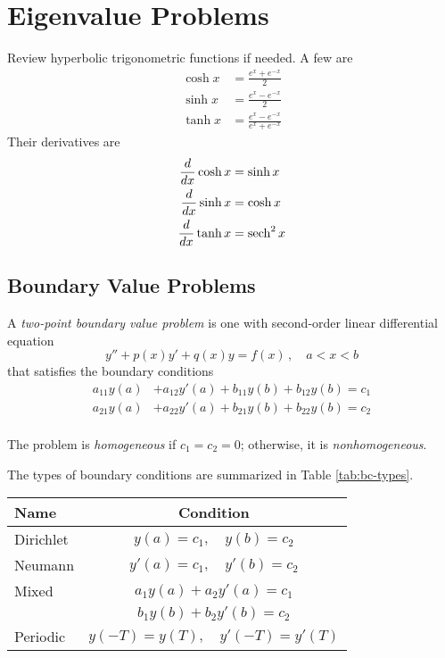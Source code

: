 \chapter{Eigenvalue Problems}
Review hyperbolic trigonometric functions if needed. A few are
\begin{align*}
    \cosh x & = \frac{e^x + e^{-x}}{2} \\
    \sinh x & = \frac{e^x - e^{-x}}{2} \\
    \tanh x & = \frac{e^x - e^{-x}}{e^x + e^{-x}} 
\end{align*}
Their derivatives are
\begin{align*}
    \frac{d}{dx}\cosh x & = \sinh x \\
    \frac{d}{dx}\sinh x & = \cosh x \\
    \frac{d}{dx}\tanh x & = \operatorname{sech} ^2 x 
\end{align*}



\section{Boundary Value Problems}
A \emph{two-point boundary value problem} is one with second-order linear differential equation
\begin{equation}
    y'' + p(x) y'+ q(x) y = f(x)\,,\quad a<x<b
\end{equation}
that satisfies the boundary conditions
\begin{align*}
    a_{11} y(a) & +  a_{12} y'(a) +  b_{11} y(b) +  b_{12} y(b) = c_1 \\
    a_{21} y(a) & +  a_{22} y'(a) +  b_{21} y(b) +  b_{22} y(b) = c_2 \\
\end{align*}

The problem is \emph{homogeneous} if $c_1=c_2=0$; otherwise, it is \emph{nonhomogeneous}.

The types of boundary conditions are summarized in Table \ref{tab:bc-types}.
\begin{center}
\begin{tabular}[t]{lc} \label{tab:bc-types}
 Name & Condition \\
 \hline
 Dirichlet & $y(a)=c_1, \quad y(b)=c_2$ \\ 
 Neumann   & $y'(a)=c_1, \quad y'(b)=c_2$ \\ 
 Mixed     & $a_1 y(a) + a_2 y'(a)=c_1$ \\
           & $b_1 y(b) + b_2 y'(b)=c_2$   \\
 Periodic  & $y(-T)=y(T), \quad y'(-T)=y'(T)$ 
\end{tabular}
\end{center}



